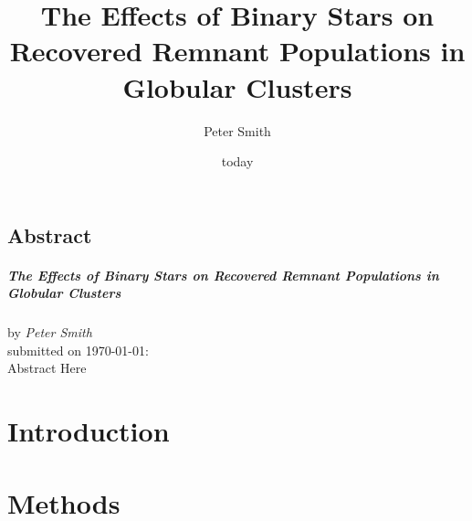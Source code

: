 \documentclass[12pt, oneside]{smuthesis}
\begin{document}
\frontmatter
\title{\sc The Effects of Binary Stars on Recovered Remnant Populations in Globular Clusters}
\author{Peter Smith}
\date{today}
\medskip

\maketitle
\pagestyle{headings}





\newcommand{\ps}[1]{{\color{NavyBlue} Peter: #1}}


\begin{center}
    \section*{\center \sc Abstract}
    \paragraph*{\center \sc The Effects of Binary Stars on Recovered Remnant Populations in Globular Clusters\\}
    by {\em Peter Smith}\\
    submitted on \today:\\

    Abstract Here


\end{center}
\newpage

\tableofcontents
\listoffigures
\listoftables
\newpage
%


\mainmatter
\chapter{Introduction}

\newpage

\chapter{Methods}

\newpage
\end{document}
